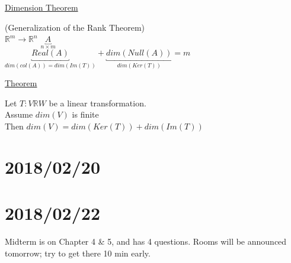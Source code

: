 \documentclass[12pt]{article}
\newcommand{\real}[0]{\mathbb{R}}
\newenvironment{block}[1][Label]{\underline{#1}\par}{}
\newenvironment{theorem}{\block[Theorem]}{\endblock}
\newcommand{\uu}[1]{\underbracket{#1}}
\newcommand{\todo}[0]{\text{\textcolor{red}{\textbackslash\textbackslash TODO \ }}}
\begin{document}
\begin{block}[Dimension Theorem]
	(Generalization of the Rank Theorem) \\
	$\real^m \rightarrow \real^n$ \qquad $\uu{A}_{n \times m}$ \\
	$\uu{Real(A)}_{dim(col(A)) = dim(Im(T))} + \uu{dim(Null(A))}_{dim(Ker(T))} = m$
	
	\begin{theorem}
		Let $T: V \real W$ be a linear transformation. \\
		Assume $dim(V)$ is finite \\
		Then $dim(V) = dim(Ker(T)) + dim(Im(T))$
	\end{theorem}
\end{block}

\section{2018/02/20}

\todo

\section{2018/02/22}

Midterm is on Chapter 4 \& 5, and has 4 questions. Rooms will be announced tomorrow; try to get there 10 min early.
\end{document}

